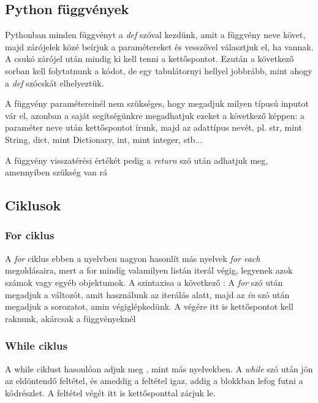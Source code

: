 \documentclass{article}
\theoremstyle{definition}
\theoremstyle{theorem}
\begin{document}
\subsection{Python függvények}
Pythonban minden függvényt a \textit{def} szóval kezdünk, amit a függvény neve követ, majd zárójelek közé beírjuk a paramétereket és vesszővel választjuk el, ha vannak. A csukó zárójel után mindig ki kell tenni a kettőspontot. Ezután a következő sorban kell folytatnunk a kódot, de egy tabulátornyi hellyel jobbrább, mint ahogy a \textit{def} szócskát elhelyeztük.

A függvény paramétereinél nem szükséges, hogy megadjuk milyen típusú inputot vár el, azonban a saját segítségünkre megadhatjuk ezeket a következő képpen: a paraméter neve után kettőspontot írunk, majd az adattípus nevét, pl. str, mint String, dict, mint Dictionary, int, mint integer, stb...


A függvény visszatérési értékét pedig a \textit{return} szó után adhatjuk meg, amennyiben szükség van rá
\subsection{Ciklusok}
\subsubsection{For ciklus}
A \textit{for} ciklus ebben a nyelvben nagyon hasonlít más nyelvek \textit{for each} megoldásaira, mert a for mindig valamilyen listán iterál végig, legyenek azok számok vagy egyéb objektumok. A szintaxisa a következő :
A \textit{for} szó után megadjuk a változót, amit használunk az iterálás alatt, majd az \textit{in} szó után megadjuk a sorozatot, amin végiglépkedünk. A végére itt is kettőspontot kell raknunk, akárcsak a függvényeknél


\pagebreak
\subsubsection{While ciklus}
A while ciklust hasonlóan adjuk meg , mint más nyelvekben. A \textit{while} szó után jön az eldöntendő feltétel, és ameddig a feltétel igaz, addig a blokkban lefog futni a kódrészlet. A feltétel végét itt is kettősponttal zárjuk le.

\end{document}
